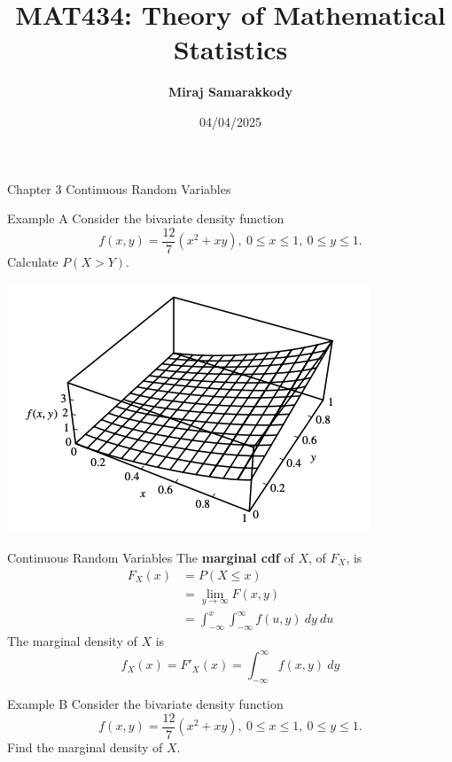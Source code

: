 \documentclass{beamer}
\title{MAT434: Theory of Mathematical Statistics}
\author{\textbf{Miraj Samarakkody}}
\institute{Tougaloo College}
\date{04/04/2025}
\begin{document}
\begin{frame}
    \titlepage
\end{frame}



\begin{frame}{Chapter 3}
    \Huge{Continuous Random Variables \cite{RJA2006}}
\end{frame}





\begin{frame}{Example A}
    Consider the bivariate density function \[f(x,y)=\dfrac{12}{7}(x^2+xy),~0 \leq x \leq 1,~0\leq y \leq 1.\] Calculate \(P(X>Y)\). 

    \includegraphics[scale=0.5]{Figures/fig_7.png}


\end{frame}

\begin{frame}{Continuous Random Variables}
    The \textbf{marginal cdf} of \(X\), of \(F_X\), is \begin{align*}
        F_X(x) & = P(X \leq x)\\
        & = \lim_{y \to \infty}F(x,y)\\
        & = \int_{-\infty}^{x} \int_{-\infty}^{\infty} f(u,y)~dy~du
    \end{align*}
    The marginal density of \(X\) is \[f_X(x)=F'_X(x)= \int_{-\infty}^{\infty}f(x,y)~dy\]
\end{frame}


\begin{frame}{Example B}
    Consider the bivariate density function \[f(x,y)=\dfrac{12}{7}(x^2+xy),~0 \leq x \leq 1,~0\leq y \leq 1.\] Find the marginal density of \(X\). 


\end{frame}
\end{document}

